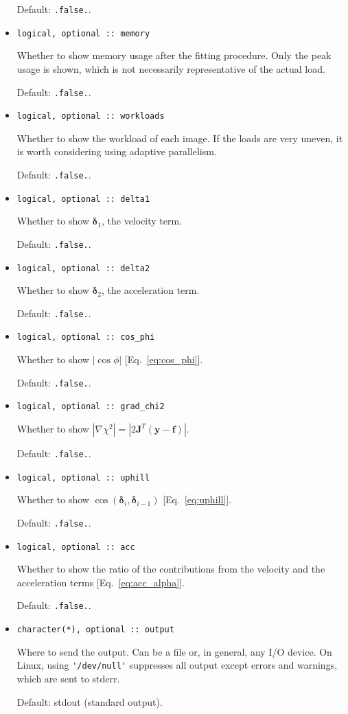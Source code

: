\documentclass{article}
\begin{document}
\begin{itemize}
  Default: \verb+.false.+.
\item 
\begin{verbatim}
logical, optional :: memory
\end{verbatim}
  Whether to show memory usage after the fitting procedure. Only the peak usage is shown, which is not necessarily representative of the actual load.

  Default: \verb+.false.+.
\item 
\begin{verbatim}
logical, optional :: workloads
\end{verbatim}
  Whether to show the workload of each image. If the loads are very uneven, it is worth considering using adaptive parallelism.

  Default: \verb+.false.+.
\item 
\begin{verbatim}
logical, optional :: delta1
\end{verbatim}
  Whether to show $\bm\delta_1$, the velocity term.

  Default: \verb+.false.+.
\item 
\begin{verbatim}
logical, optional :: delta2
\end{verbatim}
  Whether to show $\bm\delta_2$, the acceleration term.

  Default: \verb+.false.+.
\item 
\begin{verbatim}
logical, optional :: cos_phi
\end{verbatim}
  Whether to show $|\cos\phi|$ [Eq.~\eqref{eq:cos_phi}].

  Default: \verb+.false.+.
\item 
\begin{verbatim}
logical, optional :: grad_chi2
\end{verbatim}
  Whether to show $|\nabla \chi^2| = |2\bm J^T (\bm y - \bm f)|$.

  Default: \verb+.false.+.
\item 
\begin{verbatim}
logical, optional :: uphill
\end{verbatim}
  Whether to show $\cos(\bm\delta_i,\bm\delta_{i-1})$
  [Eq.~\eqref{eq:uphill}].

  Default: \verb+.false.+.
\item 
\begin{verbatim}
logical, optional :: acc
\end{verbatim}
  Whether to show the ratio of the contributions from the velocity and the acceleration terms [Eq.~\eqref{eq:acc_alpha}].

  Default: \verb+.false.+.
\item 
\begin{verbatim}
character(*), optional :: output
\end{verbatim}
  Where to send the output. Can be a file or, in general, any I/O device. On Linux, using \verb+'/dev/null'+ suppresses all output except errors and warnings, which are sent to stderr.

  Default: stdout (standard output).
\end{itemize}
\end{document}
